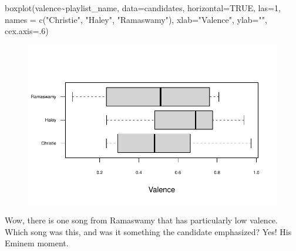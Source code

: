 \documentclass[
  letterpaper,
  DIV=11,
  numbers=noendperiod]{scrreprt}
\newenvironment{Shaded}{\begin{snugshade}}{\end{snugshade}}
\newcommand{\AttributeTok}[1]{\textcolor[rgb]{0.40,0.45,0.13}{#1}}
\newcommand{\ConstantTok}[1]{\textcolor[rgb]{0.56,0.35,0.01}{#1}}
\newcommand{\DecValTok}[1]{\textcolor[rgb]{0.68,0.00,0.00}{#1}}
\newcommand{\FunctionTok}[1]{\textcolor[rgb]{0.28,0.35,0.67}{#1}}
\newcommand{\NormalTok}[1]{\textcolor[rgb]{0.00,0.23,0.31}{#1}}
\newcommand{\OtherTok}[1]{\textcolor[rgb]{0.00,0.23,0.31}{#1}}
\newcommand{\SpecialCharTok}[1]{\textcolor[rgb]{0.37,0.37,0.37}{#1}}
\newcommand{\StringTok}[1]{\textcolor[rgb]{0.13,0.47,0.30}{#1}}
\begin{document}
\begin{Shaded}
\begin{Highlighting}[]
\FunctionTok{boxplot}\NormalTok{(valence}\SpecialCharTok{\textasciitilde{}}\NormalTok{playlist\_name, }\AttributeTok{data=}\NormalTok{candidates, }\AttributeTok{horizontal=}\ConstantTok{TRUE}\NormalTok{, }\AttributeTok{las=}\DecValTok{1}\NormalTok{, }
        \AttributeTok{names =} \FunctionTok{c}\NormalTok{(}\StringTok{"Christie"}\NormalTok{, }\StringTok{"Haley"}\NormalTok{,}
                                                                                \StringTok{"Ramaswamy"}\NormalTok{), }
        \AttributeTok{xlab=}\StringTok{"Valence"}\NormalTok{, }\AttributeTok{ylab=}\StringTok{""}\NormalTok{,}
        \AttributeTok{cex.axis=}\NormalTok{.}\DecValTok{6}\NormalTok{)}
\end{Highlighting}
\end{Shaded}

\begin{figure}[H]

{\centering \includegraphics{11-TextasData_files/figure-pdf/unnamed-chunk-30-1.pdf}

}

\end{figure}

Wow, there is one song from Ramaswamy that has particularly low valence.
Which song was this, and was it something the candidate emphasized? Yes!
His Eminem moment.

\begin{Shaded}
\end{Shaded}
\end{document}
